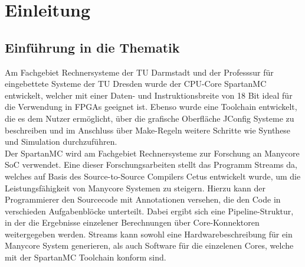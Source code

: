 \chapter{Einleitung}
\section{Einführung in die Thematik}
Am Fachgebiet Rechnersysteme der TU Darmstadt und der Professsur für eingebettete Systeme der TU Dresden wurde der CPU-Core
SpartanMC entwickelt, welcher mit einer Daten- und Instruktionsbreite von 18 Bit ideal für die Verwendung in FPGAs geeignet ist.
Ebenso wurde eine Toolchain entwickelt, die es dem Nutzer ermöglicht, über die grafische Oberfläche JConfig Systeme zu beschreiben und
im Anschluss über Make-Regeln weitere Schritte wie Synthese und Simulation durchzuführen. \cite{The_SpartanMC_Project}\\
Der SpartanMC wird am Fachgebiet Rechnersysteme zur Forschung an Manycore SoC verwendet. Eine dieser Forschungsarbeiten stellt das Programm \textmu\/Streams da,
welches auf Basis des Source-to-Source Compilers Cetus \cite{CETUS} entwickelt wurde, um die Leistungsfähigkeit von Manycore Systemen zu steigern. 
Hierzu kann der Programmierer den Sourcecode mit Annotationen versehen, die den Code in verschieden Aufgabenblöcke unterteilt. Dabei ergibt sich
eine Pipeline-Struktur, in der die Ergebnisse einzelener Berechnungen über Core-Konnektoren weitergegeben werden.
\textmu\/Streams kann sowohl eine Hardwarebeschreibung für ein Manycore System generieren, als auch Software für die einzelenen Cores, 
welche mit der SpartanMC Toolchain konform sind. \cite{WeberThesis}\\
